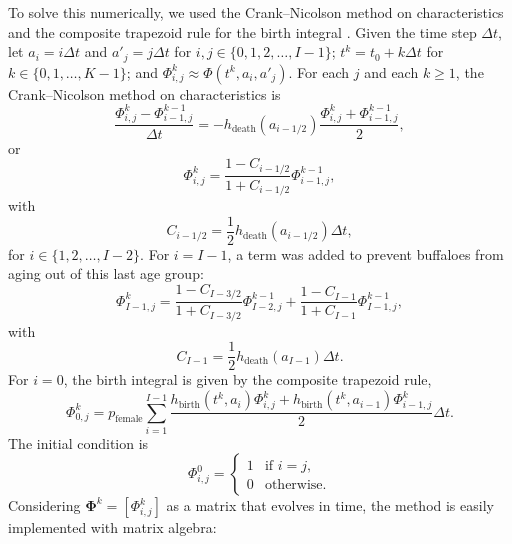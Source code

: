 \documentclass[12pt, USenglish]{article}  %
\newcommand{\mat}[1]{\mathbf{#1}}
\begin{document}
To solve this numerically, we used the Crank--Nicolson method on
characteristics and the composite trapezoid rule for the birth
integral \autocite{milner_1992}.  Given the time step $\Delta t$,
let $a_i = i \Delta t$
and $a'_j = j \Delta t$
for $i, j \in \{0, 1, 2, \ldots, I - 1\}$;
$t^k = t_0 + k \Delta t$
for $k \in \{0, 1, \ldots, K - 1\}$;
and $\Phi_{i, j}^k \approx \Phi(t^k, a_i, a'_j)$.
For each $j$
and each $k \geq 1$, the Crank--Nicolson method on characteristics is
\begin{equation}
  \label{CN_step}
  \frac{\Phi_{i, j}^k - \Phi_{i - 1, j}^{k - 1}}{\Delta t}
  = - h_{\text{death}}(a_{i - 1 / 2})
  \frac{\Phi_{i, j}^k + \Phi_{i - 1, j}^{k - 1}}{2},
\end{equation}
or
\begin{equation}
  \Phi_{i, j}^k
  = \frac{1 - C_{i - 1 / 2}}{1 + C_{i - 1 / 2}}
  \Phi_{i - 1, j}^{k - 1},
\end{equation}
with
\begin{equation}
  C_{i - 1 / 2}
  = \frac{1}{2} h_{\text{death}}(a_{i - 1 / 2}) \Delta t,
\end{equation}
for $i \in \{1, 2, \ldots, I - 2\}$.  For $i = I - 1$,
a term was added to prevent buffaloes from aging out of this
last age group:
\begin{equation}
  \Phi_{I - 1, j}^k
  = \frac{1 - C_{I - 3 / 2}}{1 + C_{I - 3 / 2}}
  \Phi_{I - 2, j}^{k - 1}
  + \frac{1 - C_{I - 1}}{1 + C_{I - 1}}
  \Phi_{I - 1, j}^{k - 1},
\end{equation}
with
\begin{equation}
  C_{I - 1}
  = \frac{1}{2} h_{\text{death}}(a_{I - 1}) \Delta t.
\end{equation}
For $i = 0$, the birth integral is given by the composite trapezoid rule,
\begin{equation}
  \label{birth_step}
  \Phi_{0, j}^k =
  p_{\text{female}}
  \sum_{i = 1}^{I - 1}
  \frac{h_{\text{birth}}(t^k, a_i) \Phi_{i, j}^k +
    h_{\text{birth}}(t^k, a_{i - 1}) \Phi_{i - 1, j}^k}{2}
  \Delta t.
\end{equation}
The initial condition is
\begin{equation}
  \Phi_{i, j}^0 =
  \begin{cases}
    1 & \text{if $i = j$}, \\
    0 & \text{otherwise}.
  \end{cases}
\end{equation}
Considering $\mat{\Phi}^k = [\Phi_{i, j}^k]$ as a matrix that
evolves in time, the method is easily implemented with matrix algebra:
\end{document}
